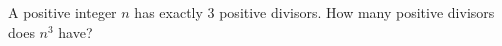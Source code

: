 A positive integer $n$ has exactly $3$ positive divisors. How many positive divisors does $n^3$ have?
